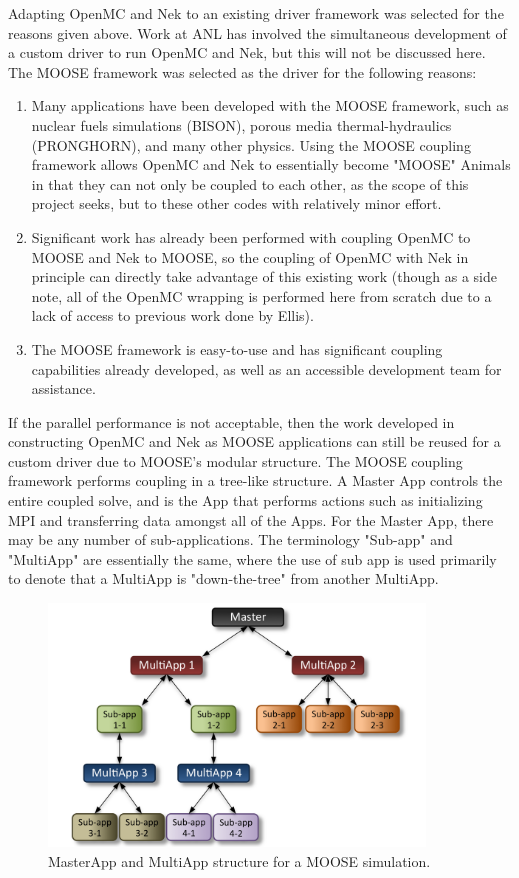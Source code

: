 \documentclass[10pt]{article}
\numberwithin{equation}{section} %
\begin{document}
Adapting OpenMC and Nek to an existing driver framework was selected for the reasons given above. Work at ANL has involved the simultaneous development of a custom driver to run OpenMC and Nek, but this will not be discussed here. The MOOSE framework was selected as the driver for the following reasons:

\begin{enumerate}
\item Many applications have been developed with the MOOSE framework, such as nuclear fuels simulations (BISON), porous media thermal-hydraulics (PRONGHORN), and many other physics. Using the MOOSE coupling framework allows OpenMC and Nek to essentially become "MOOSE" Animals in that they can not only be coupled to each other, as the scope of this project seeks, but to these other codes with relatively minor effort.
\item Significant work has already been performed with coupling OpenMC to MOOSE and Nek to MOOSE, so the coupling of OpenMC with Nek in principle can directly take advantage of this existing work (though as a side note, all of the OpenMC wrapping is performed here from scratch due to a lack of access to previous work done by Ellis).
\item The MOOSE framework is easy-to-use and has significant coupling capabilities already developed, as well as an accessible development team for assistance.
\end{enumerate}

If the parallel performance is not acceptable, then the work developed in constructing OpenMC and Nek as MOOSE applications can still be reused for a custom driver due to MOOSE's modular structure. The MOOSE coupling framework performs coupling in a tree-like structure. A Master App controls the entire coupled solve, and is the App that performs actions such as initializing MPI and transferring data amongst all of the Apps. For the Master App, there may be any number of sub-applications. The terminology "Sub-app" and "MultiApp" are essentially the same, where the use of sub app is used primarily to denote that a MultiApp is "down-the-tree" from another MultiApp. 

\begin{figure}[H]
\centering
\includegraphics[width=10cm]{figures/multiapp_hierarchy.png}
\caption{MasterApp and MultiApp structure for a MOOSE simulation.}
\end{figure}
\end{document}
